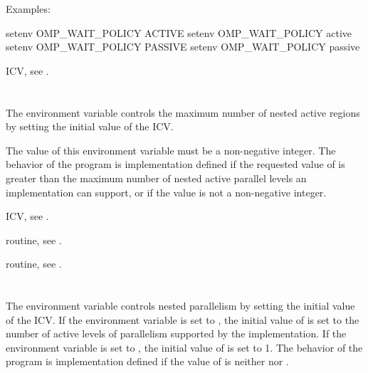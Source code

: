 Examples:
\begin{ompEnv}
setenv OMP_WAIT_POLICY ACTIVE
setenv OMP_WAIT_POLICY active
setenv OMP_WAIT_POLICY PASSIVE
setenv OMP_WAIT_POLICY passive
\end{ompEnv}

\begin{crossrefs}
\item {} ICV, see .
\end{crossrefs}



\section{}
\label{sec:OMP_MAX_ACTIVE_LEVELS}
The  environment variable controls the maximum number
of nested active  regions by setting the initial value of the
 ICV.

The value of this environment variable must be a non-negative integer. The
behavior of the program is implementation defined if the requested value of
 is greater than the maximum number of nested
active parallel levels an implementation can support, or if the value is not a
non-negative integer.

\begin{crossrefs}
\item {} ICV, see .

\item {} routine, 
see .

\item {} routine, 
see .
\end{crossrefs}



\section{}
\label{sec:OMP_NESTED}
The  environment variable controls nested parallelism by
setting the initial value of the  ICV. If the
environment variable is set to , the initial value of
 is set to the number of active levels of
parallelism supported by the implementation. If the environment variable is
set to , the initial value of 
is set to 1. The behavior of the program is implementation defined if the
value of  is neither  nor .

